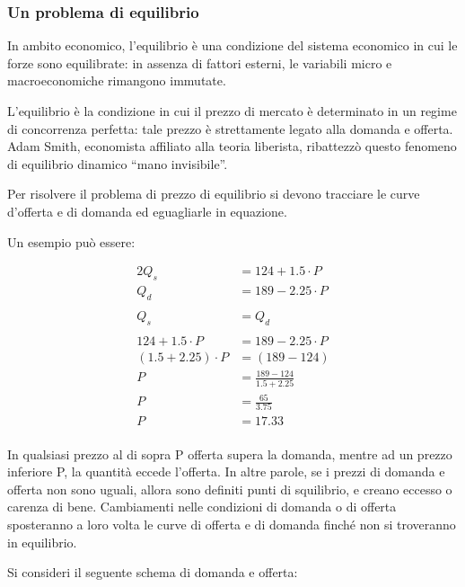 
\subsubsection{Un problema di equilibrio}

In ambito economico, l'equilibrio è una condizione del sistema economico in cui 
le forze sono equilibrate: in assenza di fattori esterni, le variabili micro e 
macroeconomiche rimangono immutate.

L'equilibrio è la condizione in cui il prezzo di mercato è determinato in 
un regime di concorrenza perfetta: tale prezzo è strettamente legato alla 
domanda e offerta. Adam Smith, economista affiliato alla 
teoria liberista, ribattezzò questo fenomeno di equilibrio 
dinamico ``mano invisibile''.

Per risolvere il problema di prezzo di equilibrio si devono tracciare le curve 
d'offerta e di domanda ed eguagliarle in equazione.

Un esempio può essere: 

\begin{alignat}{2}
 Q_s & = 124 + 1.5 \cdot P \\
 Q_d & = 189 - 2.25 \cdot P \\
\\
 Q_s & = Q_d \\
\\
 124 + 1.5 \cdot P & = 189 - 2.25 \cdot P \\
 (1.5 + 2.25) \cdot P & = (189 - 124) \\
 P & = \frac{189 - 124}{1.5 + 2.25} \\
 P & = \frac{65}{3.75} \\
 P & = 17.33 \\
\end{alignat}


In qualsiasi prezzo al di sopra P offerta supera la domanda, mentre ad un 
prezzo inferiore P, la quantità eccede l'offerta. In altre parole, se i prezzi 
di domanda e offerta non sono uguali, allora sono definiti punti di squilibrio, 
e creano eccesso o carenza di bene.  Cambiamenti nelle condizioni di domanda o 
di offerta sposteranno a loro volta le curve di offerta e di domanda finché non 
si troveranno in equilibrio.

Si consideri il seguente schema di domanda e offerta:

